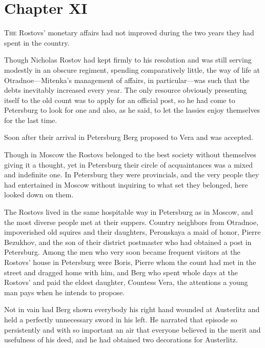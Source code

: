 \chapter*{Chapter XI}
\ifaudio     
{} 
\fi

\lettrine[lines=2, loversize=0.3, lraise=0]{\initfamily T}{he}
Rostovs' monetary affairs had not improved during the two
years they had spent in the country.

Though Nicholas Rostov had kept firmly to his resolution and was
still serving modestly in an obscure regiment, spending
comparatively little, the way of life at Otradnoe---Mitenka's
management of affairs, in particular---was such that the debts
inevitably increased every year. The only resource obviously
presenting itself to the old count was to apply for an official
post, so he had come to Petersburg to look for one and also, as
he said, to let the lassies enjoy themselves for the last time.

Soon after their arrival in Petersburg Berg proposed to Vera and
was accepted.

Though in Moscow the Rostovs belonged to the best society without
themselves giving it a thought, yet in Petersburg their circle of
acquaintances was a mixed and indefinite one. In Petersburg they
were provincials, and the very people they had entertained in
Moscow without inquiring to what set they belonged, here looked
down on them.

The Rostovs lived in the same hospitable way in Petersburg as in
Moscow, and the most diverse people met at their suppers. Country
neighbors from Otradnoe, impoverished old squires and their
daughters, Peronskaya a maid of honor, Pierre Bezukhov, and the
son of their district postmaster who had obtained a post in
Petersburg. Among the men who very soon became frequent visitors
at the Rostovs' house in Petersburg were Boris, Pierre whom the
count had met in the street and dragged home with him, and Berg
who spent whole days at the Rostovs' and paid the eldest
daughter, Countess Vera, the attentions a young man pays when he
intends to propose.

Not in vain had Berg shown everybody his right hand wounded at
Austerlitz and held a perfectly unnecessary sword in his left. He
narrated that episode so persistently and with so important an
air that everyone believed in the merit and usefulness of his
deed, and he had obtained two decorations for Austerlitz.

